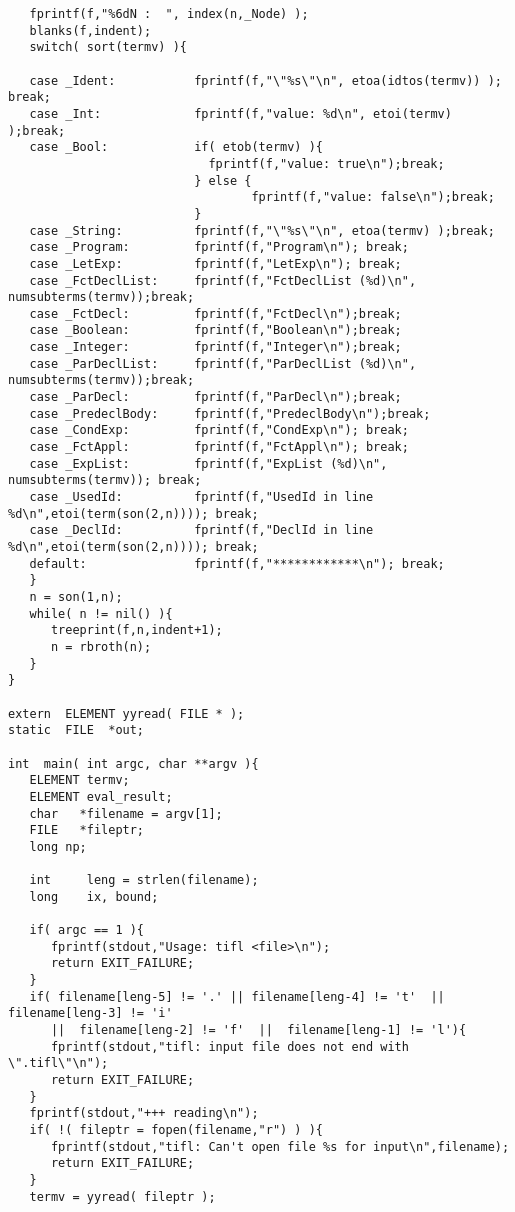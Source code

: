 \begin{verbatim}
   fprintf(f,"%6dN :  ", index(n,_Node) );
   blanks(f,indent);
   switch( sort(termv) ){

   case _Ident:           fprintf(f,"\"%s\"\n", etoa(idtos(termv)) ); break;
   case _Int:             fprintf(f,"value: %d\n", etoi(termv) );break;
   case _Bool:            if( etob(termv) ){
                            fprintf(f,"value: true\n");break;
                          } else {
                                  fprintf(f,"value: false\n");break;
                          }
   case _String:          fprintf(f,"\"%s\"\n", etoa(termv) );break;
   case _Program:         fprintf(f,"Program\n"); break;
   case _LetExp:          fprintf(f,"LetExp\n"); break;
   case _FctDeclList:     fprintf(f,"FctDeclList (%d)\n", numsubterms(termv));break;
   case _FctDecl:         fprintf(f,"FctDecl\n");break;
   case _Boolean:         fprintf(f,"Boolean\n");break;
   case _Integer:         fprintf(f,"Integer\n");break;
   case _ParDeclList:     fprintf(f,"ParDeclList (%d)\n", numsubterms(termv));break;
   case _ParDecl:         fprintf(f,"ParDecl\n");break;
   case _PredeclBody:     fprintf(f,"PredeclBody\n");break;
   case _CondExp:         fprintf(f,"CondExp\n"); break;
   case _FctAppl:         fprintf(f,"FctAppl\n"); break;
   case _ExpList:         fprintf(f,"ExpList (%d)\n", numsubterms(termv)); break;
   case _UsedId:          fprintf(f,"UsedId in line %d\n",etoi(term(son(2,n)))); break;
   case _DeclId:          fprintf(f,"DeclId in line %d\n",etoi(term(son(2,n)))); break;
   default:               fprintf(f,"************\n"); break;
   }      
   n = son(1,n);
   while( n != nil() ){
      treeprint(f,n,indent+1);
      n = rbroth(n);
   }
}

extern  ELEMENT yyread( FILE * );
static  FILE  *out;

int  main( int argc, char **argv ){
   ELEMENT termv;
   ELEMENT eval_result;
   char   *filename = argv[1];
   FILE   *fileptr;
   long np;

   int     leng = strlen(filename);
   long    ix, bound;
   
   if( argc == 1 ){
      fprintf(stdout,"Usage: tifl <file>\n");
      return EXIT_FAILURE;
   }
   if( filename[leng-5] != '.' || filename[leng-4] != 't'  ||  filename[leng-3] != 'i' 
      ||  filename[leng-2] != 'f'  ||  filename[leng-1] != 'l'){
      fprintf(stdout,"tifl: input file does not end with \".tifl\"\n");
      return EXIT_FAILURE;
   }
   fprintf(stdout,"+++ reading\n");
   if( !( fileptr = fopen(filename,"r") ) ){
      fprintf(stdout,"tifl: Can't open file %s for input\n",filename);
      return EXIT_FAILURE;
   }
   termv = yyread( fileptr );


\end{verbatim}
